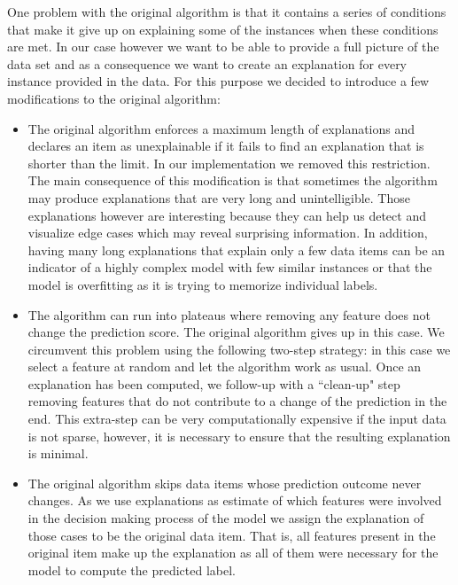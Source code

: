 One problem with the original algorithm is that it contains a series of conditions that make it give up on explaining some of the instances when these conditions are met. In our case however we want to be able to provide a full picture of the data set and as a consequence we want to create an explanation for every instance provided in the data.
%
For this purpose we decided to introduce a few modifications to the original algorithm:
%
%
\begin{itemize}
    \item The original algorithm enforces a maximum length of explanations and declares an item as unexplainable if it fails to find an explanation that is shorter than the limit. In our implementation we removed this restriction. The main consequence of this modification is that sometimes the algorithm may produce explanations that are very long and unintelligible. Those explanations however are interesting because they can help us detect and visualize edge cases which may reveal surprising information. In addition, having many long explanations that explain only a few data items can be an indicator of a highly complex model with few similar instances or that the model is overfitting as it is trying to memorize individual labels. 
    
    \item The algorithm can run into plateaus where removing any feature does not change the prediction score. The original algorithm gives up in this case. We circumvent this problem using the following two-step strategy: in this case we select a feature at random and let the algorithm work as usual. Once an explanation has been computed, we follow-up with a ``clean-up" step removing features that do not contribute to a change of the prediction in the end. This extra-step can be very computationally expensive if the input data is not sparse, however, it is necessary to ensure that the resulting explanation is minimal.
    
    \item The original algorithm skips data items whose prediction outcome never changes. As we use explanations as estimate of which features were involved in the decision making process of the model we assign the explanation of those cases to be the original data item. That is, all features present in the original item make up the explanation as all of them were necessary for the model to compute the predicted label.
\end{itemize}
